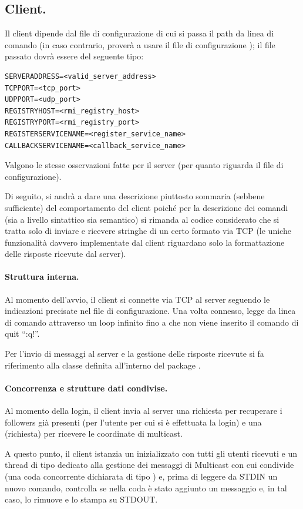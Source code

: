 \documentclass[11pt, italian, openany]{book}
\begin{document}
\begin{sloppypar}
\subsection{Client.}
Il client dipende dal file di configurazione di cui si passa il path da linea di comando (in caso
contrario, prover\`a a usare il file di configurazione );
il file passato dovr\`a essere del seguente tipo:
\begin{lstlisting}[style=code]
SERVERADDRESS=<valid_server_address>
TCPPORT=<tcp_port>
UDPPORT=<udp_port>
REGISTRYHOST=<rmi_registry_host>
REGISTRYPORT=<rmi_registry_port>
REGISTERSERVICENAME=<register_service_name>
CALLBACKSERVICENAME=<callback_service_name>
\end{lstlisting}
Valgono le stesse osservazioni fatte per il server (per quanto riguarda il file di configurazione).

Di seguito, si andr\`a a dare una descrizione piuttosto sommaria (sebbene sufficiente) del comportamento del client poich\'e per la descrizione
dei comandi (sia a livello sintattico sia semantico) si rimanda al codice considerato che si tratta solo di inviare e ricevere stringhe
di un certo formato via TCP (le uniche funzionalit\`a davvero implementate dal client riguardano solo la formattazione delle risposte
ricevute dal server).

\paragraph*{Struttura interna.}
Al momento dell'avvio, il client si connette via TCP al server seguendo le indicazioni precisate nel file di configurazione.
Una volta connesso, legge da linea di comando attraverso un loop infinito fino a che non viene inserito il comando di quit ``:q!''.

Per l'invio di messaggi al server e la gestione delle risposte ricevute si fa riferimento alla classe  definita
all'interno del package .

\paragraph*{Concorrenza e strutture dati condivise.}
Al momento della login, il client invia al server una richiesta per recuperare i followers gi\`a presenti (per l'utente per cui si \`e
effettuata la login) e una (richiesta) per ricevere le coordinate di multicast.

A questo punto, il client istanzia un  inizializzato con tutti gli utenti ricevuti e un thread di tipo
 dedicato
alla gestione dei messaggi di Multicast con cui condivide
 (una coda concorrente dichiarata di tipo ) e, prima di leggere da STDIN un nuovo comando,
controlla se nella coda \`e stato aggiunto un messaggio e, in tal caso, lo rimuove e lo stampa su STDOUT.


\end{sloppypar}
\end{document}
